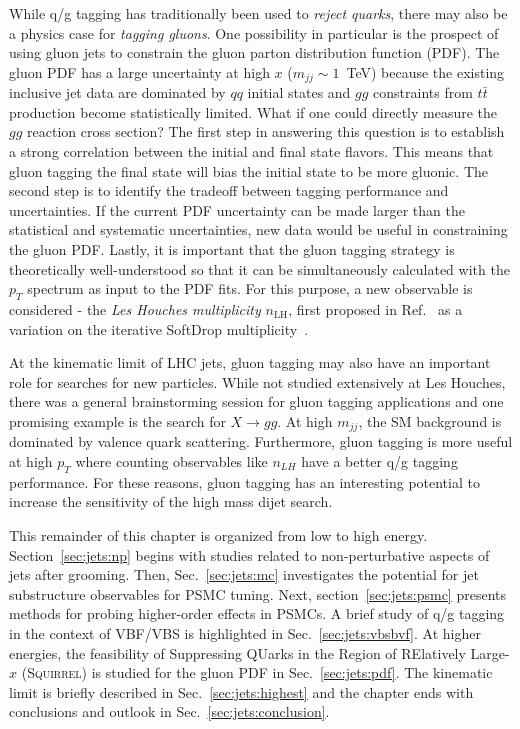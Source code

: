 \documentclass[11pt]{cernrep}
\begin{document}
While q/g tagging has traditionally been used to \textit{reject quarks}, there may also be a physics case for \textit{tagging gluons}.  One possibility in particular is the prospect of using gluon jets to constrain the gluon parton distribution function (PDF).  The gluon PDF has a large uncertainty at high $x$ ($m_{jj}\sim 1$~TeV) because the existing inclusive jet data are dominated by $qq$ initial states and $gg$ constraints from $t\bar{t}$ production become statistically limited.  What if one could directly measure the $gg$ reaction cross section?  The first step in answering this question is to establish a strong correlation between the initial and final state flavors.  This means that gluon tagging the final state will bias the initial state to be more gluonic.   The second step is to identify the tradeoff between tagging performance and uncertainties.  If the current PDF uncertainty can be made larger than the statistical and systematic uncertainties, new data would be useful in constraining the gluon PDF.  Lastly, it is important that the gluon tagging strategy is theoretically well-understood so that it can be simultaneously calculated with the $p_T$ spectrum as input to the PDF fits.  For this purpose, a new observable is considered - the \textit{Les Houches multiplicity} $n_\text{LH}$, first proposed in Ref.~\cite{Marzani:2019hun} as a variation on the iterative SoftDrop multiplicity~\cite{Frye:2017yrw}.

At the kinematic limit of LHC jets, gluon tagging may also have an important role for searches for new particles.  While not studied extensively at Les Houches, there was a general brainstorming session for gluon tagging applications and one promising example is the search for $X\rightarrow gg$.  At high $m_{jj}$, the SM background is dominated by valence quark scattering.  Furthermore, gluon tagging is more useful at high $p_T$ where counting observables like $n_{LH}$ have a better q/g tagging performance.  For these reasons, gluon tagging has an interesting potential to increase the sensitivity of the high mass dijet search.

This remainder of this chapter is organized from low to high energy.  Section~\ref{sec:jets:np} begins with studies related to non-perturbative aspects of jets after grooming.  Then, Sec.~\ref{sec:jets:mc} investigates the potential for jet substructure observables for PSMC tuning.  Next, section~\ref{sec:jets:psmc} presents methods for probing higher-order effects in PSMCs.  A brief study of q/g tagging in the context of VBF/VBS is highlighted in Sec.~\ref{sec:jets:vbsbvf}.  At higher energies, the feasibility of Suppressing QUarks in the Region of RElatively Large-$x$ (\textsc{Squirrel}) is studied for the gluon PDF in Sec.~\ref{sec:jets:pdf}.  The kinematic limit is briefly described in Sec.~\ref{sec:jets:highest} and the chapter ends with conclusions and outlook in Sec.~\ref{sec:jets:conclusion}.
\end{document}
